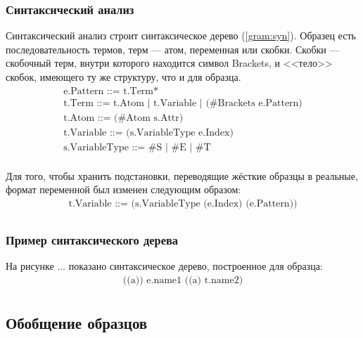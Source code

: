 \documentclass[12pt]{article}
\begin{document}
\subsubsection[Синтаксический анализ]{\large Синтаксический анализ}
\hspace{\parindent} Синтаксический анализ строит синтаксическое дерево (\ref{gram:syn}). Образец есть последовательность термов, терм --- атом, переменная или скобки. Скобки --- скобочный терм, внутри которого находится символ
Brackets, и <<тело>> скобок, имеющего ту же структуру, что и для образца.
\begin{equation}\label{gram:syn}
\begin{array}{l}
\textrm{e.Pattern ::= t.Term*} \\
\textrm{t.Term ::= t.Atom | t.Variable | (\#Brackets e.Pattern)} \\
\textrm{t.Atom ::= (\#Atom s.Attr)} \\
\textrm{t.Variable ::= (s.VariableType e.Index)} \\
\textrm{s.VariableType ::= \#S | \#E | \#T} \\
\end{array}
\end{equation}

\indent Для того, чтобы хранить подстановки, переводящие жёсткие образцы в реальные, формат переменной был изменен следующим образом:
\begin{equation*}
\begin{array}{l}
\textrm{t.Variable ::= (s.VariableType (e.Index) (e.Pattern))} \\
\end{array}
\end{equation*}

\subsubsection[Пример синтаксического дерева]{\large Пример синтаксического дерева}
\hspace{\parindent} На рисунке ... показано синтаксическое дерево, построенное для образца:
\begin{equation*}
\begin{array}{l}
\textrm{((a)) e.name1 ((a) t.name2)} \\
\end{array}
\end{equation*}

\subsection[Обобщение образцов]{\large Обобщение образцов}
\hspace{\parindent} 
\end{document}
